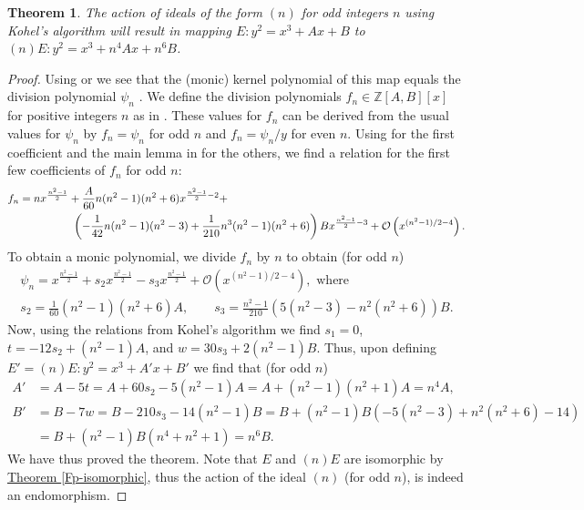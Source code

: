 \documentclass[openany, a4paper, 10pt]{book}
\theoremstyle{plain}
\newtheorem{theorem}{Theorem}[chapter]
\theoremstyle{plain}
\theoremstyle{plain}
\theoremstyle{definition}
\theoremstyle{plain}
\theoremstyle{definition}
\theoremstyle{remark}
\newcommand{\theoref}[1]{\hyperref[#1]{Theorem \ref{#1}}}
\begin{document}
\begin{theorem}\label{perfect_ideals}
    The action of ideals of the form $(n)$ for odd integers $n$ using Kohel's algorithm \cite[Section~2.4]{Kohel} will result in mapping
    $E: y^2=x^3+Ax+B$ to $(n)E: y^2=x^3+n^4Ax+n^6B$.
\end{theorem}
\begin{proof}
    Using \cite[Theorem~9.8.7]{galbraith_crypto} or \cite[p.~14]{Kohel} we see that the (monic) kernel polynomial of this map equals the division polynomial $\psi_n$ \cite[Section~6.5]{coefficients} \cite[Definition~9.8.5]{galbraith_crypto}.
    We define the division polynomials $f_n \in \mathbb Z[A, B][x]$ for positive integers $n$ as in
    \cite[Equation~1]{coefficients2}.
    These values for $f_n$ can be derived from the usual values for $\psi_n$  by $f_n = \psi_n$ for odd $n$ and $f_n = \psi_n/y$ for even $n$.
    Using \cite[Lemma~6.21]{coefficients} for the first coefficient and the main lemma in \cite{coefficients2} for the others, we find a relation for the first few coefficients of $f_n$ for odd $n$:
    \begin{align*}
        f_n &= n x^{\frac{n^2-1}{2}} + \frac{A}{60}n(n^2-1)(n^2+6) x^{\frac{n^2-1}{2}-2} + \\
            & \hspace{1.7cm} \left(-\frac{1}{42}n(n^2-1)(n^2-3)+\frac{1}{210}n^3(n^2-1)(n^2+6)\right)B x^{\frac{n^2-1}{2}-3} + \mathcal O\left(x^{(n^2-1)/2-4}\right).
    \end{align*}
    To obtain a monic polynomial, we divide $f_n$ by $n$ to obtain (for odd $n$)
    \begin{gather*}
        \psi_n = x^{\frac{n^2-1}{2}} + s_2x^{\frac{n^2-1}{2}} - s_3x^{\frac{n^2-1}{2}} + \mathcal O\left(x^{(n^2-1)/2-4}\right),\text{ where} \\
        s_2 = \frac{1}{60}(n^2-1)(n^2+6)A, \qquad s_3 = \frac{n^2-1}{210}\left(5(n^2-3)-n^2(n^2+6)\right)B.
    \end{gather*}
    Now, using the relations from Kohel's algorithm \cite[Section~2.4]{Kohel} we find $s_1=0$,
    $t = -12 s_2 + (n^2-1)A$, and $w = 30s_3 + 2(n^2-1)B$.
    Thus, upon defining $E' = (n)E: y^2 = x^3+A'x + B'$ we find that (for odd $n$)
    \begin{align*}
        A' &= A - 5t = A + 60 s_2 - 5 (n^2-1)A = A + (n^2-1)(n^2+1)A = n^4A, \\
        B' &= B - 7w = B - 210 s_3 - 14(n^2-1)B = B + (n^2-1)B (-5(n^2-3)+n^2(n^2+6) - 14) \\
           &= B + (n^2-1)B(n^4+n^2+1) = n^6B.
    \end{align*}
    We have thus proved the theorem.
    Note that $E$ and $(n)E$ are isomorphic by \theoref{Fp-isomorphic}, thus the action of the ideal $(n)$ (for odd $n$), is indeed an endomorphism.
\end{proof}
\end{document}
